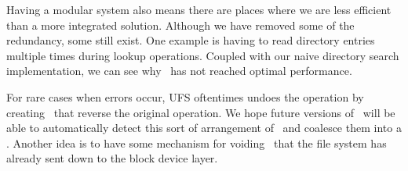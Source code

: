 Having a modular system also means there are places where we are less
efficient than a more integrated solution. Although we have removed some
of the redundancy, some still exist. One example is having to read directory
entries multiple times during lookup operations. Coupled with our naive
directory search implementation, we can see why \Kudos\ has not reached
optimal performance.

For rare cases when errors occur, UFS oftentimes undoes the operation by
creating \chdescs\ that reverse the original operation. We hope future
versions of \Kudos\ will be able to automatically detect this sort of
arrangement of \chdescs\ and coalesce them into a \noop. Another idea is to
have some mechanism for voiding \chdescs\ that the file system has already
sent down to the block device layer.
